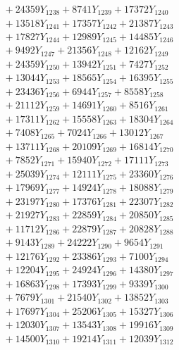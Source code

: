 \documentclass[a4paper,10pt]{article}
\begin{document}
{\begin{align}
&\;  + 24359 Y_{1238} + 8741 Y_{1239} + 17372 Y_{1240} \\[0.3ex]
&\;  + 13518 Y_{1241} + 17357 Y_{1242} + 21387 Y_{1243} \\[0.3ex]
&\;  + 17827 Y_{1244} + 12989 Y_{1245} + 14485 Y_{1246} \\[0.3ex]
&\;  + 9492 Y_{1247} + 21356 Y_{1248} + 12162 Y_{1249} \\[0.3ex]
&\;  + 24359 Y_{1250} + 13942 Y_{1251} + 7427 Y_{1252} \\[0.3ex]
&\;  + 13044 Y_{1253} + 18565 Y_{1254} + 16395 Y_{1255} \\[0.3ex]
&\;  + 23436 Y_{1256} + 6944 Y_{1257} + 8558 Y_{1258} \\[0.5ex]\allowbreak
&\;  + 21112 Y_{1259} + 14691 Y_{1260} + 8516 Y_{1261} \\[0.3ex]
&\;  + 17311 Y_{1262} + 15558 Y_{1263} + 18304 Y_{1264} \\[0.3ex]
&\;  + 7408 Y_{1265} + 7024 Y_{1266} + 13012 Y_{1267} \\[0.3ex]
&\;  + 13711 Y_{1268} + 20109 Y_{1269} + 16814 Y_{1270} \\[0.3ex]
&\;  + 7852 Y_{1271} + 15940 Y_{1272} + 17111 Y_{1273} \\[0.3ex]
&\;  + 25039 Y_{1274} + 12111 Y_{1275} + 23360 Y_{1276} \\[0.3ex]
&\;  + 17969 Y_{1277} + 14924 Y_{1278} + 18088 Y_{1279} \\[0.3ex]
&\;  + 23197 Y_{1280} + 17376 Y_{1281} + 22307 Y_{1282} \\[0.3ex]
&\;  + 21927 Y_{1283} + 22859 Y_{1284} + 20850 Y_{1285} \\[0.3ex]
&\;  + 11712 Y_{1286} + 22879 Y_{1287} + 20828 Y_{1288} \\[0.5ex]\allowbreak
&\;  + 9143 Y_{1289} + 24222 Y_{1290} + 9654 Y_{1291} \\[0.3ex]
&\;  + 12176 Y_{1292} + 23386 Y_{1293} + 7100 Y_{1294} \\[0.3ex]
&\;  + 12204 Y_{1295} + 24924 Y_{1296} + 14380 Y_{1297} \\[0.3ex]
&\;  + 16863 Y_{1298} + 17393 Y_{1299} + 9339 Y_{1300} \\[0.3ex]
&\;  + 7679 Y_{1301} + 21540 Y_{1302} + 13852 Y_{1303} \\[0.3ex]
&\;  + 17697 Y_{1304} + 25206 Y_{1305} + 15327 Y_{1306} \\[0.3ex]
&\;  + 12030 Y_{1307} + 13543 Y_{1308} + 19916 Y_{1309} \\[0.3ex]
&\;  + 14500 Y_{1310} + 19214 Y_{1311} + 12039 Y_{1312} \\[0.3ex]

\end{align}}
\end{document}
